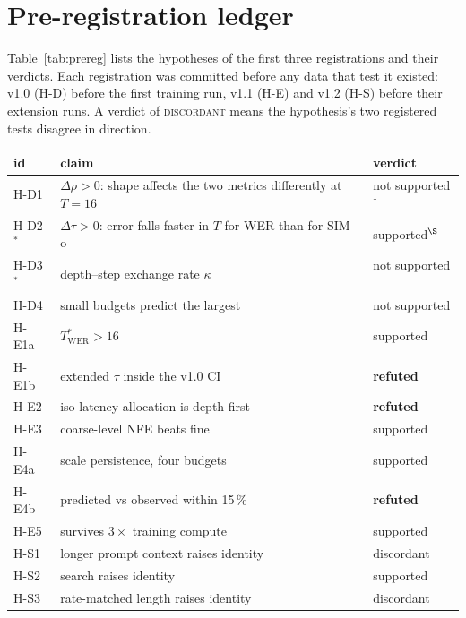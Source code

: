 \section{Pre-registration ledger}
\label{app:prereg}
Table~\ref{tab:prereg} lists the hypotheses of the first three registrations and their
verdicts. Each registration was committed before any data that test it existed: v1.0 (H-D)
before the first training run, v1.1 (H-E) and v1.2 (H-S) before their extension runs. A
verdict of \textsc{discordant} means the hypothesis's two registered tests disagree in
direction.

\begin{center}\captionsetup{hypcap=false}%
  \label{tab:prereg}
  \footnotesize
  \begin{tabular}{lll}
    \toprule
    id & claim & verdict \\
    \midrule
    H-D1 & $\Delta\rho>0$: shape affects the two metrics differently at $T{=}16$ & not supported$^{\dagger}$ \\
    H-D2$^{*}$ & $\Delta\tau>0$: error falls faster in $T$ for WER than for SIM-o & supported$^{\S}$ \\
    H-D3$^{*}$ & depth--step exchange rate $\kappa$ & not supported$^{\dagger}$ \\
    H-D4 & small budgets predict the largest & not supported \\
    H-E1a & $T^{*}_{\mathrm{WER}}>16$ & supported \\
    H-E1b & extended $\tau$ inside the v1.0 CI & \textbf{refuted} \\
    H-E2 & iso-latency allocation is depth-first & \textbf{refuted} \\
    H-E3 & coarse-level NFE beats fine & supported \\
    H-E4a & scale persistence, four budgets & supported \\
    H-E4b & predicted vs observed within 15\,\% & \textbf{refuted} \\
    H-E5 & survives $3\times$ training compute & supported \\
    H-S1 & longer prompt context raises identity & discordant \\
    H-S2 & search raises identity & supported \\
    H-S3 & rate-matched length raises identity & discordant \\

\end{tabular}
\end{center}
